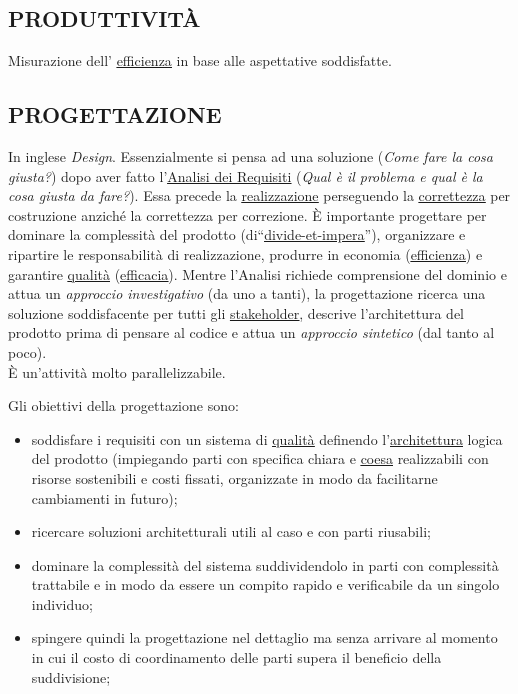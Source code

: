 		\subsection{PRODUTTIVITÀ}  \label{produttivita}
		Misurazione dell' \underline{\hyperref[efficienza]{efficienza}} in base alle aspettative soddisfatte.
		
		\subsection{PROGETTAZIONE}  \label{progettazione} %
		In inglese \textit{Design}. Essenzialmente si pensa ad una soluzione (\textit{Come fare la cosa giusta?}) dopo aver fatto l'\underline{\hyperref[analisideirequisiti]{Analisi dei Requisiti}} (\textit{Qual è il problema e qual è la cosa giusta da fare?}). Essa precede la \underline{\hyperref[realizzazione]{realizzazione}} perseguendo la \underline{\hyperref[correttezza]{correttezza}} per costruzione anziché la correttezza per correzione. È importante progettare per dominare la complessità del prodotto (di“\underline{\hyperref[divideetimpera]{divide-et-impera}}”), organizzare e ripartire le responsabilità di realizzazione, produrre in economia (\underline{\hyperref[efficienza]{efficienza}}) e garantire \underline{\hyperref[qualita]{qualità}} (\underline{\hyperref[efficacia]{efficacia}}). Mentre l'Analisi richiede comprensione del dominio e attua un \textit{approccio investigativo} (da uno a tanti), la progettazione ricerca una soluzione soddisfacente per tutti gli \underline{\hyperref[stakeholder]{stakeholder}}, descrive l'architettura del prodotto prima di pensare al codice e attua un \textit{approccio sintetico} (dal tanto al poco). \\
		È un'attività molto parallelizzabile.
		
		Gli obiettivi della progettazione sono: 
		\begin{itemize}
			\item soddisfare i requisiti con un sistema di \underline{\hyperref[qualita]{qualità}} definendo l'\underline{\hyperref[architettura]{architettura}} logica del prodotto (impiegando parti con specifica chiara e \underline{\hyperref[coeso]{coesa}} realizzabili con risorse sostenibili e costi fissati, organizzate in modo da facilitarne cambiamenti in futuro);
			\item ricercare soluzioni architetturali utili al caso e con parti riusabili;
			\item  dominare la complessità del sistema suddividendolo in parti con complessità trattabile e in modo da essere un compito rapido e verificabile da un singolo individuo;
			\item spingere quindi la progettazione nel dettaglio ma senza arrivare al momento in cui il costo di coordinamento delle parti supera il beneficio della suddivisione; 
		\end{itemize}
	

